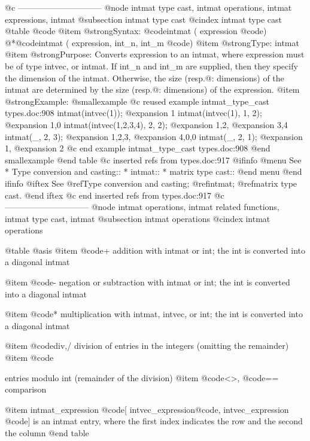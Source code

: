 {{{@c ------------------------------
@node intmat type cast,  intmat operations, intmat expressions, intmat
@subsection intmat type cast
@cindex intmat type cast
@table @code
@item @strong{Syntax:}
@code{intmat (} expression @code{)}
@*@code{intmat (} expression, int_n, int_m  @code{)}
@item @strong{Type:}
intmat
@item @strong{Purpose:}
Converts expression to an intmat, where expression must be of type
intvec, or intmat. If
int_n and int_m are supplied, then they specify the dimension of the
intmat. Otherwise, the size (resp.@: dimensions) of the intmat
are determined  by the size (resp.@: dimensions) of the
expression.
@item @strong{Example:}
@smallexample
@c reused example intmat_type_cast types.doc:908 
  intmat(intvec(1));
@expansion{} 1 
  intmat(intvec(1), 1, 2);
@expansion{} 1,0 
  intmat(intvec(1,2,3,4), 2, 2);
@expansion{} 1,2,
@expansion{} 3,4 
  intmat(_, 2, 3);
@expansion{} 1,2,3,
@expansion{} 4,0,0 
  intmat(_, 2, 1);
@expansion{} 1,
@expansion{} 2 
@c end example intmat_type_cast types.doc:908
@end smallexample
@end table
@c inserted refs from types.doc:917
@ifinfo
@menu
See
* Type conversion and casting::
* intmat::
* matrix type cast::
@end menu
@end ifinfo
@iftex
See
@ref{Type conversion and casting};
@ref{intmat};
@ref{matrix type cast}.
@end iftex
@c end inserted refs from types.doc:917
@c ------------------------------
@node intmat operations, intmat related functions, intmat type cast, intmat
@subsection intmat operations
@cindex intmat operations

@table @asis
@item @code{+}
addition with intmat or int; the int is converted into a diagonal intmat

@item @code{-}
negation or subtraction with intmat or int; the int is converted into a
diagonal intmat

@item @code{*}
multiplication with intmat, intvec, or int; the int is converted into a
diagonal intmat

@item @code{div,/}
division of entries in the integers (omitting the remainder)
@item @code{%
entries modulo int (remainder of the division)
@item @code{<>}, @code{==}
comparison

@item intmat_expression @code{[} intvec_expression@code{,} intvec_expression @code{]}
is an intmat entry, where the first index indicates the row and the
second the column
@end table

}}}}
